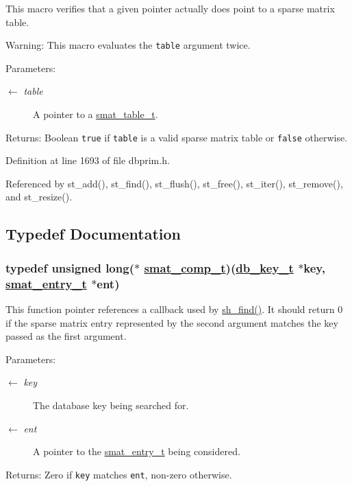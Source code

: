 This macro verifies that a given pointer actually does point to a sparse matrix table.

\begin{Desc}
\item[Warning:]This macro evaluates the {\tt table} argument twice.\end{Desc}
\begin{Desc}
\item[Parameters:]
\begin{description}
\item[\mbox{$\leftarrow$} {\em table}]A pointer to a \hyperlink{group__dbprim__smat_ga0}{smat\_\-table\_\-t}.\end{description}
\end{Desc}
\begin{Desc}
\item[Returns:]Boolean {\tt true} if {\tt table} is a valid sparse matrix table or {\tt false} otherwise.\end{Desc}


Definition at line 1693 of file dbprim.h.

Referenced by st\_\-add(), st\_\-find(), st\_\-flush(), st\_\-free(), st\_\-iter(), st\_\-remove(), and st\_\-resize().

\subsection{Typedef Documentation}
\hypertarget{group__dbprim__smat_ga5}{
\subsubsection[smat\_\-comp\_\-t]{\setlength{\rightskip}{0pt plus 5cm}typedef unsigned long($\ast$ \hyperlink{group__dbprim__smat_ga5}{smat\_\-comp\_\-t})(\hyperlink{struct__db__key__s}{db\_\-key\_\-t} $\ast$key, \hyperlink{struct__smat__entry__s}{smat\_\-entry\_\-t} $\ast$ent)}}
\label{group__dbprim__smat_ga5}


This function pointer references a callback used by \hyperlink{group__dbprim__smat_ga20}{sh\_\-find()}. It should return 0 if the sparse matrix entry represented by the second argument matches the key passed as the first argument.

\begin{Desc}
\item[Parameters:]
\begin{description}
\item[\mbox{$\leftarrow$} {\em key}]The database key being searched for. \item[\mbox{$\leftarrow$} {\em ent}]A pointer to the \hyperlink{group__dbprim__smat_ga2}{smat\_\-entry\_\-t} being considered.\end{description}
\end{Desc}
\begin{Desc}
\item[Returns:]Zero if {\tt key} matches {\tt ent}, non-zero otherwise.\end{Desc}


